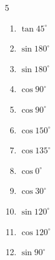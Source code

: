 \begin{multicols}{5}
\begin{enumerate}

  \item $\displaystyle \tan{45^\circ}$

        \phantom{$\displaystyle =1$}

  \item $\displaystyle \sin{180^\circ}$

        \phantom{$\displaystyle =0$}

\columnbreak %

  \item $\displaystyle \sin{180^\circ}$

        \phantom{$\displaystyle =0$}

  \item $\displaystyle \cos{90^\circ}$

        \phantom{$\displaystyle =0$}

  \item $\displaystyle \cos{90^\circ}$

        \phantom{$\displaystyle =0$}

  \item $\displaystyle \cos{150^\circ}$


  \item $\displaystyle \cos{135^\circ}$


  \item $\displaystyle \cos{0^\circ}$

        \phantom{$\displaystyle =1$}

  \item $\displaystyle \cos{30^\circ}$


  \item $\displaystyle \sin{120^\circ}$


  \item $\displaystyle \cos{120^\circ}$


  \item $\displaystyle \sin{90^\circ}$

        \phantom{$\displaystyle =1$}


\end{enumerate}
\end{multicols}
